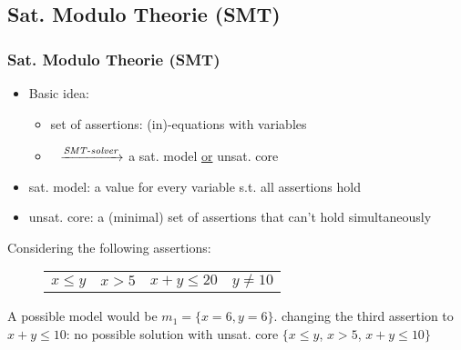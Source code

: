 \subsection{Sat. Modulo Theorie (SMT)}

\begin{frame}
	\frametitle{Sat. Modulo Theorie (SMT)}
	
	\begin{itemize}
		\item Basic idea: 
			\begin{itemize}
				\item[] set of assertions: (in)-equations with variables
				\item[] \qquad$\>\>$ $\xrightarrow{\text{\textit{SMT}-\textit{solver}}}$ a sat. model \underline{or} unsat. core
			\end{itemize}		
		\item \color{blue}sat. model\color{black}: a value for every variable s.t. all assertions hold
		\item \color{blue}unsat. core\color{black}: a (minimal) set of assertions that can't hold simultaneously
	\end{itemize}
	\begin{example}
		Considering the following assertions:
		\vspace*{-1em}
		\begin{figure}[H]
			\centering
			\begin{tabular}{cccc}
				$x \le y$ &	$x > 5 $ &	$ x+ y \le 20$ &$y \neq 10$ \\
			\end{tabular}
		\end{figure}
		\vspace*{-1em}
		 A possible model would be $m_1 = \{x=6, y=6\}$.\newline \newline
		 changing the third assertion to $x+y\le10$:\newline
		 no possible solution with unsat. core $\{x \le y$, $x > 5$, $x+ y \le 10 \}$
	\end{example}
\end{frame}

